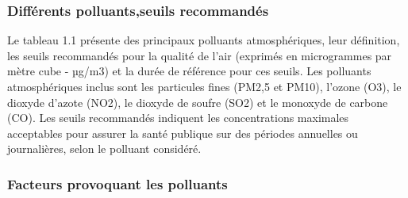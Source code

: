 \documentclass{report}
\begin{document}
\subsubsection{Différents polluants,seuils recommandés}
Le tableau 1.1 présente des principaux polluants atmosphériques, leur définition, les seuils recommandés pour la qualité de l'air (exprimés en microgrammes par mètre cube - µg/m3) et la durée de référence pour ces seuils. Les polluants atmosphériques inclus sont les particules fines (PM2,5 et PM10), l'ozone (O3), le dioxyde d'azote (NO2), le dioxyde de soufre (SO2) et le monoxyde de carbone (CO).
Les seuils recommandés indiquent les concentrations maximales acceptables pour assurer la santé publique sur des périodes annuelles ou journalières, selon le polluant considéré.
\cite{www.who.int ,OMS 2021}
\subsubsection{Facteurs provoquant les polluants } 
\end{document}
